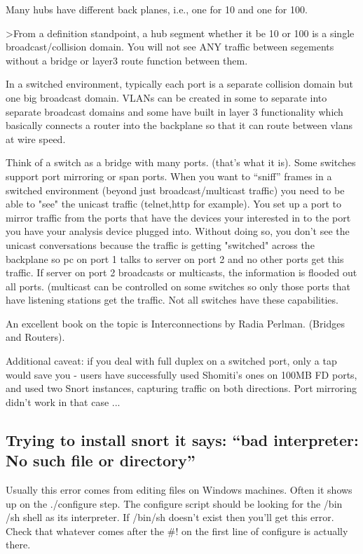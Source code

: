 \documentclass{article}
\begin{document}
Many hubs have different back planes, i.e., one for 10 and one for 100.

>From a definition standpoint, a hub segment whether it be 10 or 100 is
a single broadcast/collision domain.  You will not see ANY traffic
between segements without a bridge or layer3 route function between
them.
  
In a switched environment, typically each port is a separate collision
domain but one big broadcast domain.  VLANs can be created in some to
separate into separate broadcast domains and some have built in layer
3 functionality which basically connects a router into the backplane
so that it can route between vlans at wire speed.
  
Think of a switch as a bridge with many ports.  (that's what it is).
Some switches support port mirroring or span ports.  When you want to
``sniff'' frames in a switched environment (beyond just
broadcast/multicast traffic) you need to be able to "see" the unicast
traffic (telnet,http for example).  You set up a port to mirror
traffic from the ports that have the devices your interested in to the
port you have your analysis device plugged into.  Without doing so,
you don't see the unicast conversations because the traffic is getting
"switched" across the backplane so pc on port 1 talks to server on
port 2 and no other ports get this traffic. If server on port 2
broadcasts or multicasts, the information is flooded out all ports.
(multicast can be controlled on some switches so only those ports that
have listening stations get the traffic.  Not all switches have these
capabilities.
  
An excellent book on the topic is Interconnections by Radia Perlman.
(Bridges and Routers).
  
Additional caveat: if you deal with full duplex on a switched port,
only a tap would save you - users have successfully used Shomiti's
ones on 100MB FD ports, and used two Snort instances, capturing
traffic on both directions. Port mirroring didn't work in that case ...

\subsection{Trying to install snort it says: ``bad interpreter: No such file or
directory''}

Usually this error comes from editing files on Windows machines. Often it shows
up on the ./configure step. The configure script should be looking for the /bin
/sh shell as its interpreter. If /bin/sh doesn't exist then you'll get this
error. Check that whatever comes after the \#! on the first line of configure is
actually there.
\end{document}
